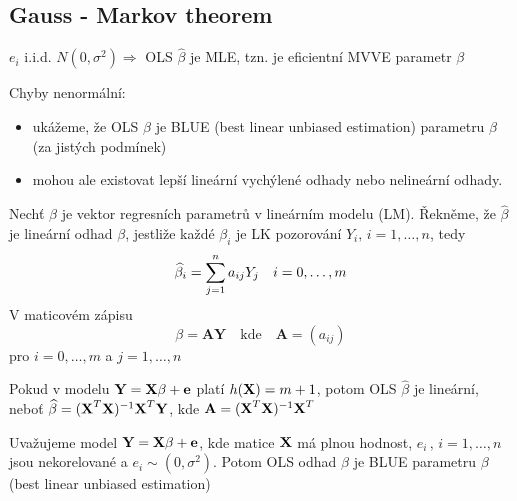 \subsection{Gauss - Markov theorem}


$ e_i $ i.i.d. $ N(0,\sigma^{2}) \Rightarrow $ OLS $ \widehat{\beta} $ je MLE, tzn. je eficientní MVVE parametr $ \beta $

Chyby nenormální:
\begin{itemize}
	\item ukážeme, že OLS $ \widehat{\beta} $ je BLUE (best linear unbiased estimation) parametru $ \beta $ (za jistých podmínek)
	\item mohou ale existovat lepší lineární vychýlené odhady nebo nelineární odhady.
\end{itemize}

\begin{define}
	Nechť $ \beta $ je vektor regresních parametrů v lineárním modelu (LM). Řekněme, že $ \widehat{\beta} $ je lineární odhad $ \beta $, jestliže každé $ \beta_i $ je LK pozorování $ Y_i, \, i = 1, \dots , n $, tedy
	$$
		\widehat{\beta}_i = \sum\limits_{j=1}^{n} a_{ij} Y_j \quad i = 0, \dots ,m
	$$
V maticovém zápisu
	$$
		\beta = \textbf{AY} \quad \text{kde} \quad \textbf{A} = (a_{ij}) 
	$$
pro $ i = 0, \dots , m $ a $ j = 1, \dots , n $
\end{define}
\begin{remark}
 Pokud v modelu $ \textbf{Y} = \textbf{X} \beta + \textbf{e} $ platí $ h(\textbf{X}) = m+1 $, potom OLS $ \widehat{\beta} $ je lineární, neboť $ \widehat{\beta} = ( \textbf{X}^{T} \textbf{X} )^{-1} \textbf{X} ^{T} \textbf{Y} $, kde $ \textbf{A} = ( \textbf{X}^{T} \textbf{X} )^{-1} \textbf{X} ^{T}  $
\end{remark}
\begin{theorem}
	Uvažujeme model $ \textbf{Y} = \textbf{X} \beta + \textbf{e} $, kde matice $ \textbf{X} $ má plnou hodnost, $ e_i \, , \, i = 1, \dots , n $ jsou nekorelované a $ e_i \sim (0, \sigma^{2}) $. Potom OLS odhad $ \widehat{\beta} $ je BLUE parametru $ \beta $ (best linear unbiased estimation)
\end{theorem}
